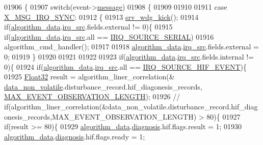 \begin{DoxyCode}
01906 \{
01907     \textcolor{keywordflow}{switch}(event->\hyperlink{a00036_adf9665938515a20c283eea2c978cf80d}{message})
01908     \{
01909 
01910 
01911         \textcolor{keywordflow}{case} \hyperlink{a00036_a104f1137aafb33160da80932fe63c40d}{X\_MSG\_IRQ\_SYNC}:
01912         \{
01913              \hyperlink{a00067_a710d148845397582739d170341f3d3d9}{srv\_wdg\_kick}();
01914             \textcolor{keywordflow}{if}(\hyperlink{a00038_a183caa40cd01e79ee309cc9c4a225197}{algorithm\_data}.\hyperlink{a00016_a1aafd556b3c9ed3e5295b17dbd80cab8}{irq\_src}.fields.external != 0)\{
01915                     \textcolor{keywordflow}{if}(\hyperlink{a00038_a183caa40cd01e79ee309cc9c4a225197}{algorithm\_data}.\hyperlink{a00016_a1aafd556b3c9ed3e5295b17dbd80cab8}{irq\_src}.all == 
      \hyperlink{a00021_a286de80383de54438b3e38d9f149dfd0}{IRQ\_SOURCE\_SERIAL})
01916                     algorithm\_cmd\_handler();
01917 
01918                   \hyperlink{a00038_a183caa40cd01e79ee309cc9c4a225197}{algorithm\_data}.\hyperlink{a00016_a1aafd556b3c9ed3e5295b17dbd80cab8}{irq\_src}.fields.external = 0;
01919             \}
01920 
01921 
01922 
01923             \textcolor{keywordflow}{if}(\hyperlink{a00038_a183caa40cd01e79ee309cc9c4a225197}{algorithm\_data}.\hyperlink{a00016_a1aafd556b3c9ed3e5295b17dbd80cab8}{irq\_src}.fields.internal != 0)\{
01924                     \textcolor{keywordflow}{if}(\hyperlink{a00038_a183caa40cd01e79ee309cc9c4a225197}{algorithm\_data}.\hyperlink{a00016_a1aafd556b3c9ed3e5295b17dbd80cab8}{irq\_src}.all == 
      \hyperlink{a00021_a51725fc3a4c26625f15db1274791d961}{IRQ\_SOURCE\_HIF\_EVENT})\{
01925                         \hyperlink{a00072_a87d38f886e617ced2698fc55afa07637}{Float32} result = algorithm\_liner\_correlation(&
      \hyperlink{a00060_a76ac5f917f5308dcd83de0d7c94559fb}{data\_non\_volatile}.disturbance\_record.hif\_diagonesis\_records,
      \hyperlink{a00022_aa060aeb1ecb530b3c6f6d91060999b70}{MAX\_EVENT\_OBSERVATION\_LENGTH});
01926                        \textcolor{comment}{//
      if(algorithm\_liner\_correlation(&data\_non\_volatile.disturbance\_record.hif\_diagonesis\_records,MAX\_EVENT\_OBSERVATION\_LENGTH) > 80)\{}
01927                          \textcolor{keywordflow}{if}(result >= 80)\{
01929                             \hyperlink{a00038_a183caa40cd01e79ee309cc9c4a225197}{algorithm\_data}.\hyperlink{a00016_a16f85d57ec98b4ad05f5a2e10536b3c6}{diagnosis}.hif.flags.result = 1;
01930                             \hyperlink{a00038_a183caa40cd01e79ee309cc9c4a225197}{algorithm\_data}.\hyperlink{a00016_a16f85d57ec98b4ad05f5a2e10536b3c6}{diagnosis}.hif.flags.ready  = 1;

\end{DoxyCode}
